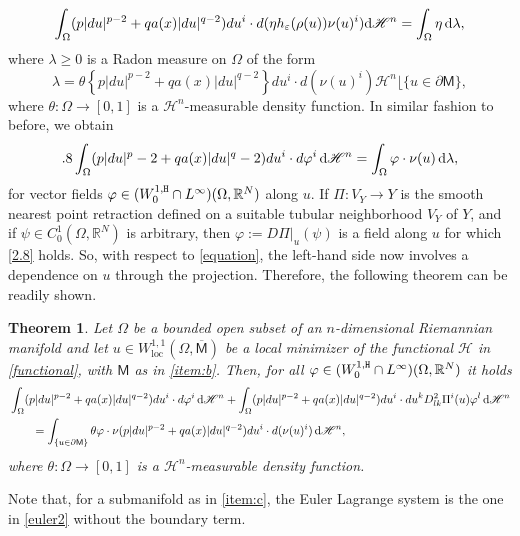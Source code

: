 \documentclass[a4paper]{amsart}
\def\loc{\operatorname{loc}}
\newtheorem{theorem}{Theorem}[section]
\theoremstyle{plain}  %
\numberwithin{equation}{section}
\def \d{\,{\rm d}}
\newcommand{\R}{\mathbb{R}}
\newcommand{\mm}{\mathsf{M}}
\newcommand{\tx}[1]{\textnormal{\texttt{#1}}}
\def\loc{\operatorname{loc}}
\def\eqn#1$$#2$${\begin{equation}\label#1#2\end{equation}}
\begin{document}
$$ \int_\Omega (p|du|^{p-2}+qa(x)|du|^{q-2})du^i \cdot d(\eta h_\varepsilon (\rho(u))\nu(u)^i) \text{d}\mathscr{H}^n= \int_{\Omega} \eta \d\lambda,$$
where $\lambda \geq 0$ is a Radon measure on $\Omega$ of the form
$$ \lambda = \theta\left \{p|du|^{p-2} +qa(x)|du|^{q-2} \right \}du^i \cdot d(\nu(u)^i) \mathscr{H}^n \lfloor \{ u \in \partial \mm\},$$
where $\theta: \Omega \to [0,1]$ is a $\mathscr{H}^n$-measurable density function. In similar fashion to before, we obtain
\eqn{2.8}
$$ \int_{\Omega} (p|du|^{p-2}+qa(x)|du|^{q-2})du^i \cdot d\varphi^i \d \mathscr{H}^n= \int_{\Omega} \varphi \cdot \nu(u) \d\lambda,$$
for vector fields $\varphi \in (W^{1,\tx{H}}_0\cap L^{\infty})(\Omega, \R^N)$ along $u$. If $\Pi: V_Y \to Y$ is the smooth nearest point retraction defined on a suitable tubular neighborhood $V_Y$ of $Y$, and if $\psi \in C^{1}_0(\Omega, \R^N)$ is arbitrary, then $\varphi:= D\Pi|_u(\psi)$ is a field along $u$ for which \eqref{2.8} holds. So, with respect to \eqref{equation}, the left-hand side now involves a dependence on $u$ through the projection. Therefore, the following theorem can be readily shown.
\begin{theorem}
  Let $\Omega$ be a  bounded open subset of an $n$-dimensional Riemannian manifold and let $u \in W^{1,1}_{\loc}
    (\Omega, \overline{\mm})$ be a local minimizer of the functional $\mathcal{H}$ in \eqref{functional}, with $\mm$ as in \ref{item:b}. Then, for all $\varphi \in (W^{1,\tx{H}}_0\cap L^{\infty})(\Omega, \R^N)$ it holds
\begin{align} \label{euler2}
   & \int_{\Omega}(p|du|^{p-2} +qa(x)|du|^{q-2})du^i \cdot d\varphi^i\d\mathscr{H}^n + \int_{\Omega}(p|du|^{p-2} +qa(x)|du|^{q-2})  du^i \cdot du^kD^2_{lk}\Pi^i(u) \varphi^l \d\mathscr{H}^n \notag \\ & \qquad = \int_{\{u\in \partial \mm\}}\theta \varphi\cdot \nu (p|du|^{p-2}+qa(x)|du|^{q-2})du^i \cdot d(\nu(u)^i) \d\mathscr{H}^n,
\end{align}
where $\theta: \Omega \to [0,1]$ is a $\mathscr{H}^n$-measurable density function.
\end{theorem}
\noindent
Note that, for a submanifold as in \ref{item:c}, the Euler Lagrange system is the one in \eqref{euler2} without the boundary term.
\end{document}

